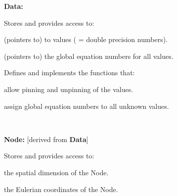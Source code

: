 \begin{center} \begin{TabularC}{1}
\hline
\begin{center} \begin{TabularC}{1}
\hline
\begin{center} {\bfseries Data\-:} \end{center} 
\begin{DoxyItemize}
\item Stores and provides access to\-:
\begin{DoxyItemize}
\item (pointers to) to values ( = double precision numbers).
\item (pointers to) the global equation numbers for all values.
\end{DoxyItemize}
\item Defines and implements the functions that\-:
\begin{DoxyItemize}
\item allow pinning and unpinning of the values.
\item assign global equation numbers to all unknown values.   
\end{DoxyItemize}
\end{DoxyItemize}\\
\end{TabularC}
\begin{TabularC}{1}
\hline
\begin{center} {\bfseries Node\-:} \newline
\mbox{[}derived from {\bfseries Data}\mbox{]} \end{center} 
\begin{DoxyItemize}
\item Stores and provides access to\-:
\begin{DoxyItemize}
\item the spatial dimension of the Node.
\item the Eulerian coordinates of the Node.   
\end{DoxyItemize}
\end{DoxyItemize}\\
\end{TabularC}
\end{center} \\
\end{TabularC}
\end{center} 

